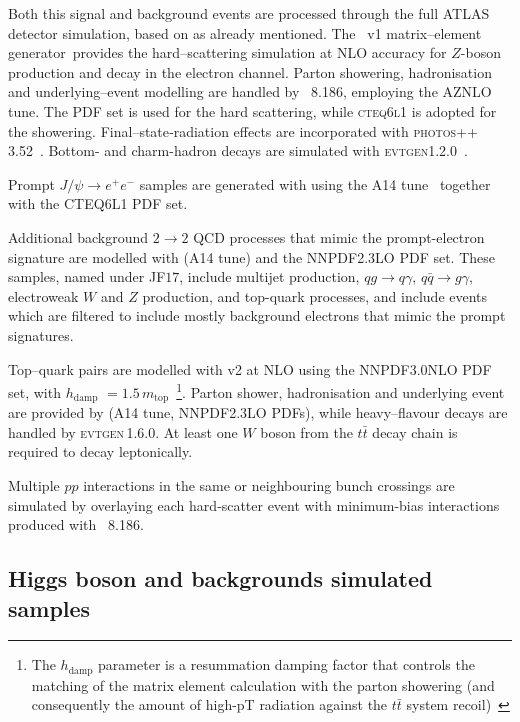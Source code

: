 Both this signal and background events are processed through the full ATLAS detector simulation, based on \geant as already mentioned. 
The \powhegbox~v1 matrix–element generator\ provides the hard–scattering simulation at NLO accuracy for $Z$-boson production and decay in the electron channel.  Parton showering, hadronisation and underlying–event modelling are handled by \pythia~8.186, employing the AZNLO tune. The \ctdiez PDF set is used for the hard scattering, while \textsc{cteq6l1} is adopted for the showering.
Final–state‐radiation effects are incorporated with \textsc{photos++}\,3.52~\cite{davidson2015photosinterfacectechnical,Golonka_2006}.  Bottom- and charm-hadron decays are simulated with \textsc{evtgen}1.2.0~\cite{LANGE2001152}.

Prompt $J/\psi\!\to e^{+}e^{-}$ samples are generated with  using the A14 tune~\cite{A14} together with the \textsc{CTEQ6L1} PDF set.  

Additional background $2\!\to\!2$ QCD processes that mimic the prompt-electron signature are modelled with  (A14 tune) and the NNPDF2.3LO PDF set. These samples, named under JF$17$, include multijet production, $qg\rightarrow q\gamma$, $q\bar{q}\rightarrow g\gamma$, electroweak $W$ and $Z$ production, and top-quark processes, 
and include events which are filtered to include mostly background electrons that mimic the prompt signatures.

Top–quark pairs are modelled with \powhegbox v2 at NLO using the NNPDF3.0NLO PDF set, with $h_{\text{damp}}$ $=1.5\,m_{\text{top}}$~\footnote{The $h_{\text{damp}}$ parameter is a resummation damping factor that controls the matching of the matrix element calculation with the parton showering (and consequently the amount of high-pT radiation against the $t\bar{t}$ system recoil)~\cite{hdamp}}.
Parton shower, hadronisation and underlying event are provided by  (A14 tune, \textsc{NNPDF2.3LO} PDFs), while heavy–flavour decays are handled by \textsc{evtgen}\,1.6.0.  At least one $W$ boson from the $t\bar t$ decay chain is required to decay leptonically.

Multiple $pp$ interactions in the same or neighbouring bunch crossings are simulated by overlaying each hard‐scatter event with minimum-bias interactions produced with \pythia~8.186.

\subsection{Higgs boson and backgrounds simulated samples}
\label{subsec:higgs_mc}

